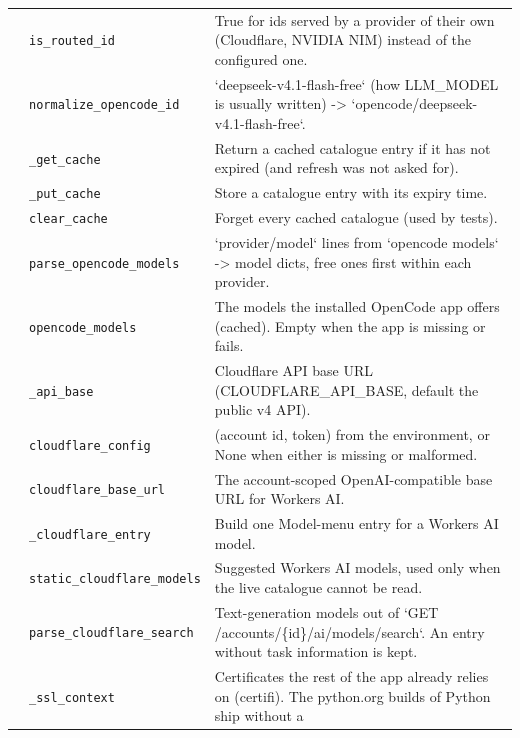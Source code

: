 \begin{longtable}{@{}p{2.8cm}>{\raggedright\arraybackslash}p{4.6cm}p{7.9cm}@{}}
{\small } & \texttt{\small is\_\allowbreak{}routed\_\allowbreak{}id} & True for ids served by a provider of their own (Cloudflare, NVIDIA NIM) instead of the configured one. \\
{\small } & \texttt{\small normalize\_\allowbreak{}opencode\_\allowbreak{}id} & `deepseek-v4.1-flash-free` (how LLM\_MODEL is usually written) -\textgreater{} `opencode/deepseek-v4.1-flash-free`. \\
{\small } & \texttt{\small \_\allowbreak{}get\_\allowbreak{}cache} & Return a cached catalogue entry if it has not expired (and refresh was not asked for). \\
{\small } & \texttt{\small \_\allowbreak{}put\_\allowbreak{}cache} & Store a catalogue entry with its expiry time. \\
{\small } & \texttt{\small clear\_\allowbreak{}cache} & Forget every cached catalogue (used by tests). \\
{\small } & \texttt{\small parse\_\allowbreak{}opencode\_\allowbreak{}models} & `provider/model` lines from `opencode models` -\textgreater{} model dicts, free ones first within each provider. \\
{\small } & \texttt{\small opencode\_\allowbreak{}models} & The models the installed OpenCode app offers (cached). Empty when the app is missing or fails. \\
{\small } & \texttt{\small \_\allowbreak{}api\_\allowbreak{}base} & Cloudflare API base URL (CLOUDFLARE\_API\_BASE, default the public v4 API). \\
{\small } & \texttt{\small cloudflare\_\allowbreak{}config} & (account id, token) from the environment, or None when either is missing or malformed. \\
{\small } & \texttt{\small cloudflare\_\allowbreak{}base\_\allowbreak{}url} & The account-scoped OpenAI-compatible base URL for Workers AI. \\
{\small } & \texttt{\small \_\allowbreak{}cloudflare\_\allowbreak{}entry} & Build one Model-menu entry for a Workers AI model. \\
{\small } & \texttt{\small static\_\allowbreak{}cloudflare\_\allowbreak{}models} & Suggested Workers AI models, used only when the live catalogue cannot be read. \\
{\small } & \texttt{\small parse\_\allowbreak{}cloudflare\_\allowbreak{}search} & Text-generation models out of `GET /accounts/\{id\}/ai/models/search`. An entry without task information is kept. \\
{\small } & \texttt{\small \_\allowbreak{}ssl\_\allowbreak{}context} & Certificates the rest of the app already relies on (certifi). The python.org builds of Python ship without a \\

\end{longtable}
